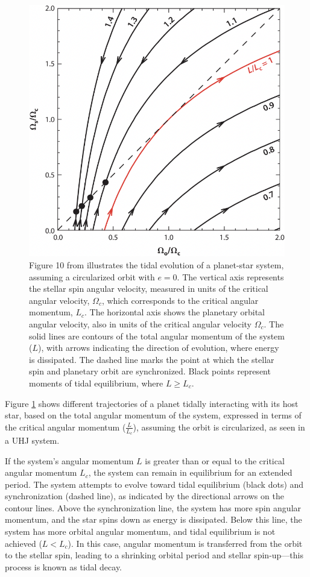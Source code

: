 \documentclass[oneside,12pt]{amsart}
\numberwithin{page}{section}
\begin{document}
\begin{figure}[htbp]
    \centering
    \includegraphics[width=0.5\linewidth]{figs/ogilvie_fig10.png}
    \caption{Figure 10 from \citet{ogilvie2014tidal} illustrates the tidal evolution of a planet-star system, assuming a circularized orbit with $e=0$. The vertical axis represents the stellar spin angular velocity, measured in units of the critical angular velocity, $\Omega_c$, which corresponds to the critical angular momentum, $L_c$. The horizontal axis shows the planetary orbital angular velocity, also in units of the critical angular velocity $\Omega_c$. The solid lines are contours of the total angular momentum of the system ($L$), with arrows indicating the direction of evolution, where energy is dissipated. The dashed line marks the point at which the stellar spin and planetary orbit are synchronized. Black points represent moments of tidal equilibrium, where $L \geq L_c$.}
    \label{fig:ogilvie-fig10}
\end{figure}

Figure \ref{fig:ogilvie-fig10} shows different trajectories of a planet tidally interacting with its host star, based on the total angular momentum of the system, expressed in terms of the critical angular momentum ($\frac{L}{L_c}$), assuming the orbit is circularized, as seen in a UHJ system.

If the system's angular momentum $L$ is greater than or equal to the critical angular momentum $L_c$, the system can remain in equilibrium for an extended period. The system attempts to evolve toward tidal equilibrium (black dots) and synchronization (dashed line), as indicated by the directional arrows on the contour lines. Above the synchronization line, the system has more spin angular momentum, and the star spins down as energy is dissipated. Below this line, the system has more orbital angular momentum, and tidal equilibrium is not achieved ($L < L_c$). In this case, angular momentum is transferred from the orbit to the stellar spin, leading to a shrinking orbital period and stellar spin-up—this process is known as tidal decay.
\end{document}
